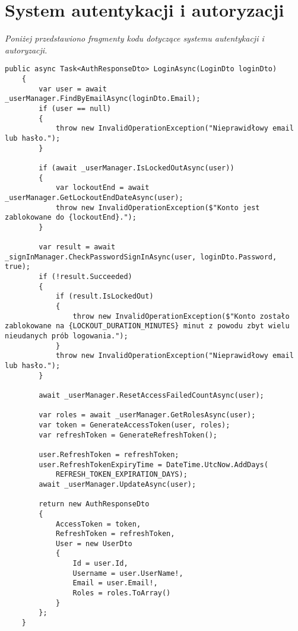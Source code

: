%

\chapter{System autentykacji i autoryzacji}
\label{chapter:dodatek_B}

\textit{Poniżej przedstawiono fragmenty kodu dotyczące systemu autentykacji i autoryzacji.}

\begin{lstlisting}[style=csharp, caption={Implementacja logowania},label={lst:logowanie}]
	public async Task<AuthResponseDto> LoginAsync(LoginDto loginDto)
	{
		var user = await _userManager.FindByEmailAsync(loginDto.Email);
		if (user == null)
		{
			throw new InvalidOperationException("Nieprawidłowy email lub hasło.");
		}
		
		if (await _userManager.IsLockedOutAsync(user))
		{
			var lockoutEnd = await _userManager.GetLockoutEndDateAsync(user);
			throw new InvalidOperationException($"Konto jest zablokowane do {lockoutEnd}.");
		}
		
		var result = await _signInManager.CheckPasswordSignInAsync(user, loginDto.Password, true);
		if (!result.Succeeded)
		{
			if (result.IsLockedOut)
			{
				throw new InvalidOperationException($"Konto zostało zablokowane na {LOCKOUT_DURATION_MINUTES} minut z powodu zbyt wielu nieudanych prób logowania.");
			}
			throw new InvalidOperationException("Nieprawidłowy email lub hasło.");
		}
		
		await _userManager.ResetAccessFailedCountAsync(user);
		
		var roles = await _userManager.GetRolesAsync(user);
		var token = GenerateAccessToken(user, roles);
		var refreshToken = GenerateRefreshToken();
		
		user.RefreshToken = refreshToken;
		user.RefreshTokenExpiryTime = DateTime.UtcNow.AddDays(
			REFRESH_TOKEN_EXPIRATION_DAYS);
		await _userManager.UpdateAsync(user);
		
		return new AuthResponseDto
		{
			AccessToken = token,
			RefreshToken = refreshToken,
			User = new UserDto
			{
				Id = user.Id,
				Username = user.UserName!,
				Email = user.Email!,
				Roles = roles.ToArray()
			}
		};
	}
\end{lstlisting}

